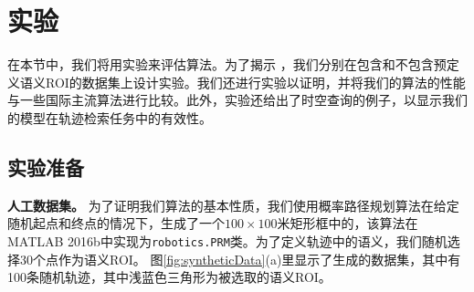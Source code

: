 \section{实验}
在本节中，我们将用实验来评估算法。为了揭示 ，我们分别在包含和不包含预定义语义ROI的数据集上设计实验。我们还进行实验以证明，并将我们的算法的性能与一些国际主流算法进行比较。此外，实验还给出了时空查询的例子，以显示我们的模型在轨迹检索任务中的有效性。

\subsection{实验准备}
\vspace{3mm}
\noindent\textbf{人工数据集。} 
为了证明我们算法的基本性质，我们使用概率路径规划算法在给定随机起点和终点的情况下，生成了一个$100\times100$米矩形框中的，该算法在 MATLAB 2016b中实现为\texttt{robotics.PRM}类。为了定义轨迹中的语义，我们随机选择30个点作为语义ROI。 图\ref{fig:syntheticData}(a)里显示了生成的数据集，其中有100条随机轨迹，其中浅蓝色三角形为被选取的语义ROI。


